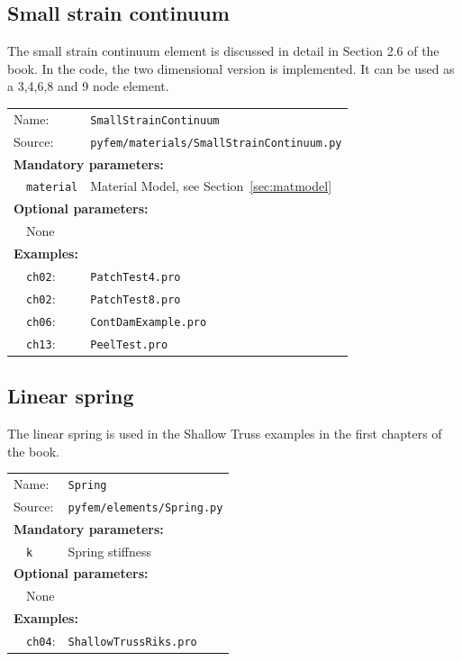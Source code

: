 \documentclass{article}
\begin{document}
\subsection{Small strain continuum}

The small strain continuum element is discussed in detail in Section 2.6 of the book. In the code, the two dimensional
version is implemented. It can be used as a 3,4,6,8 and 9 node element.

\vspace{2mm}
\begin{tabular}{p{22mm}p{74mm}}
Name:         & \texttt{SmallStrainContinuum} \\
Source:  & \texttt{pyfem/materials/SmallStrainContinuum.py} \\
\multicolumn{2}{l}{\textbf{Mandatory parameters:}} \\
~~\texttt{material} & Material Model, see Section~\ref{sec:matmodel} \\
\multicolumn{2}{l}{\textbf{Optional parameters:}} \\ 
~~None  & \\
\multicolumn{2}{l}{\textbf{Examples:}}\\
~~\texttt{ch02}: & \texttt{PatchTest4.pro}\\
~~\texttt{ch02}: & \texttt{PatchTest8.pro}\\
~~\texttt{ch06}: & \texttt{ContDamExample.pro}\\
~~\texttt{ch13}: & \texttt{PeelTest.pro}
\end{tabular}

\subsection{Linear spring}

The linear spring is used in the Shallow Truss examples in the first chapters of the book.

\vspace{2mm}
\begin{tabular}{p{22mm}p{74mm}}
Name:         & \texttt{Spring} \\
Source:  & \texttt{pyfem/elements/Spring.py} \\
\multicolumn{2}{l}{\textbf{Mandatory parameters:}} \\
~~\texttt{k} & Spring stiffness\\
\multicolumn{2}{l}{\textbf{Optional parameters:}} \\ 
~~None  & \\
\multicolumn{2}{l}{\textbf{Examples:}}\\
~~\texttt{ch04}: & \texttt{ShallowTrussRiks.pro}
\end{tabular}
\end{document}
